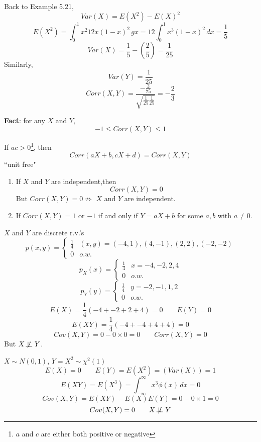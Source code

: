Back to Example 5.21,
\[Var(X)=E(X^2)-{E(X)}^2\]
\[E(X^2)=\int_0^1 x^2 12x (1-x)^2 \,gx= 12\int_0^1 x^3 (1-x)^2 \,dx=\frac{1}{5}\]
\[Var(X)=\frac{1}{5}-\left(\frac{2}{5}\right)=\frac{1}{25}\]
Similarly, \[Var(Y)=\frac{1}{25}\]
\[Corr(X,Y)=\frac{-\frac{2}{75}}{\sqrt{\frac{1}{25}\frac{1}{25}}}=-\frac{2}{3}\]

\begin{prop}
\textbf{Fact}: for any $X$ and $Y$,
\[-1\leq Corr(X,Y)\leq 1\]
\end{prop}

\begin{prop}
If $ac >0$\footnote{$a$ and $c$ are either both positive or negative}, then
\[Corr(aX+b,cX+d)=Corr(X,Y)\]
``unit free" 
\end{prop}

\begin{prop}
\begin{enumerate}
\item If $X$ and $Y$ are independent,then
\[Corr(X,Y)=0\]
But $Corr(X,Y)=0 \not\Rightarrow$ $X$ and $Y$ are independent.
\item If $Corr(X,Y)=1$ or $-1$ if and only if $Y=aX+b$ for some $a,b$ with $a \neq 0$.
\end{enumerate}
\end{prop}

\begin{exmp}
$X$ and $Y$ are discrete r.v.'s
\[p(x,y)=\begin{cases}
\frac{1}{4} &(x,y)=(-4,1),(4,-1),(2,2),(-2,-2)\\
0 & o.w.
\end{cases}\]
\[p_X(x)=\begin{cases}
\frac{1}{4} &x=-4,-2,2,4\\
0 & o.w.
\end{cases}\]
\[p_Y(y)=\begin{cases}
\frac{1}{4} &y=-2,-1,1,2\\
0 & o.w.
\end{cases}\]
\[E(X)=\frac{1}{4}(-4+-2+2+4)=0 \qquad E(Y)=0\]
\[E(XY)=\frac{1}{4}(-4+-4+4+4)=0\]
\[Cov(X,Y)=0-0\times0=0 \qquad Corr(X,Y)=0\]
But $X  \not\!\perp\!\!\!\perp Y$.
\end{exmp}

\begin{exmp}
$X \sim N(0,1)$, $Y=X^2 \sim \chi^2 (1)$
\[E(X)=0 \qquad E(Y)=E(X^2)=(Var(X))=1\]
\[E(XY)=E(X^3)=\int_{-\infty}^{\infty}x^3 \phi(x)\,dx=0\]
\[Cov(X,Y)=E(XY)-E(X)E(Y)=0-0\times1=0\]
\[Cov(X,Y)=0 \qquad X  \not\!\perp\!\!\!\perp Y\]
\end{exmp}

